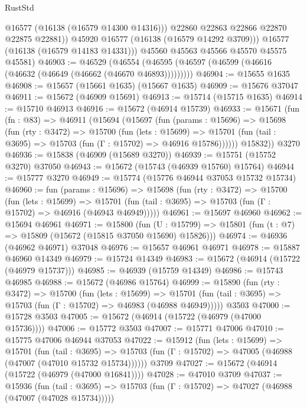 \begin{lexlean}{RustStd}
\begin{coremodule}
                @16577
                (@16138 (@16579 @14300 @14316)))
              @22860
              @22863
              @22866
              @22870
              @22875
              @22881))
          @45920
          @16577
          (@16138 (@16579 @14292 @3709)))
        @16577
        (@16138 (@16579 @14183 @14331)))
      @45560
      @45563
      @45566
      @45570
      @45575
      @45581)
@46903 := @46529
    (@46554 (@46595 (@46597 (@46599 (@46616 (@46632 (@46649 (@46662 (@46670 @46893)))))))))
@46904 := @15655 @1635
@46908 := @15657 (@15661 @1635) (@15667 @1635)
@46909 := @15676 @37047
@46911 := @15672 (@46909 @15691)
@46913 := @15714 (@15715 @1635)
@46914 := @15710 @46913
@46916 := @15672 (@46914 @15739)
@46933 := @15671
    (fun (fn : @83) =>
    @46911
      (@15694
        (@15697
          (fun (params : @15696) =>
          @15698
            (fun (rty : @3472) =>
            @15700
              (fun (lets : @15699) =>
              @15701 (fun (tail : @3695) => @15703 (fun (Γ : @15702) => @46916 @15786))))))
        @15832))
    @3270
@46936 := @15838 (@46909 (@15689 @3270))
@46939 := @15751 (@15752 @3270) @37050
@46943 := @15672 (@15743 (@46939 @15760) @15764)
@46944 := @15777 @3270
@46949 := @15774 (@15776 @46944 @37053 @15732 @15734)
@46960 := fun (params : @15696) =>
  @15698
    (fun (rty : @3472) =>
    @15700
      (fun (lets : @15699) =>
      @15701 (fun (tail : @3695) => @15703 (fun (Γ : @15702) => @46916 (@46943 @46949)))))
@46961 := @15697 @46960
@46962 := @15694 @46961
@46971 := @15800
    (fun (U : @15799) => @15801 (fun (t : @7) => @15809 (@15672 (@15815 @37050 @15690) @15826)))
@46974 := @46936 (@46962 @46971) @37048
@46976 := @15657 @46961 @46971
@46978 := @15887 @46960 @14349
@46979 := @15724 @14349
@46983 := @15672 (@46914 (@15722 (@46979 @15737)))
@46985 := @46939 (@15759 @14349)
@46986 := @15743 @46985
@46988 := @15672 (@46986 @15764)
@46999 := @15890
    (fun (rty : @3472) =>
    @15700
      (fun (lets : @15699) =>
      @15701 (fun (tail : @3695) => @15703 (fun (Γ : @15702) => @46983 (@46988 @46949)))))
    @3503
@47000 := @15728 @3503
@47005 := @15672 (@46914 (@15722 (@46979 (@47000 @15736))))
@47006 := @15772 @3503
@47007 := @15771 @47006
@47010 := @15775 @47006 @46944 @37053
@47022 := @15912
    (fun (lets : @15699) =>
    @15701
      (fun (tail : @3695) =>
      @15703 (fun (Γ : @15702) => @47005 (@46988 (@47007 (@47010 @15732 @15734))))))
    @3709
@47027 := @15672 (@46914 (@15722 (@46979 (@47000 @16841))))
@47028 := @47010 @3709
@47037 := @15936
    (fun (tail : @3695) => @15703 (fun (Γ : @15702) => @47027 (@46988 (@47007 (@47028 @15734)))))

\end{coremodule}
\end{lexlean}

